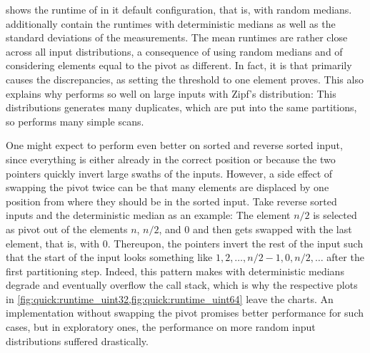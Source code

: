  shows the runtime of \QS{} in it default configuration, that is, with random medians.
 additionally contain the runtimes with deterministic medians as well as the standard deviations of the measurements.
The mean runtimes are rather close across all input distributions, a consequence of using random medians and of considering elements equal to the pivot as different.
In fact, it is \IS{} that primarily causes the discrepancies, as setting the threshold to one element proves.
This also explains why \QS{} performs so well on large inputs with Zipf's distribution:
This distributions generates many duplicates, which are put into the same partitions, so \IS{} performs many simple scans.

One might expect \QS{} to perform even better on sorted and reverse sorted input, since everything is either already in the correct position or because the two pointers quickly invert large swaths of the inputs.
However, a side effect of swapping the pivot twice can be that many elements are displaced by one position from where they should be in the sorted input.
Take reverse sorted inputs and the deterministic median as an example:
The element \(n/2\) is selected as pivot out of the elements \(n\), \(n/2\), and \(0\) and then gets swapped with the last element, that is, with \(0\).
Thereupon, the pointers invert the rest of the input such that the start of the input looks something like \(1, 2, \dots, n/2-1, 0, n/2, \dots\) after the first partitioning step.
Indeed, this pattern makes \QS{} with deterministic medians degrade and eventually overflow the call stack, which is why the respective plots in \cref{fig:quick:runtime_uint32,fig:quick:runtime_uint64} leave the charts.
An implementation without swapping the pivot promises better performance for such cases, but in exploratory ones, the performance on more random input distributions suffered drastically.
